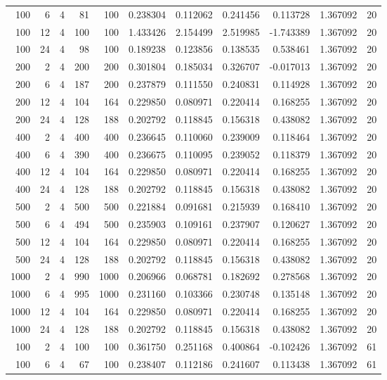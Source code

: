 \begin{table}
\begin{tabular}{rrrrrrrrrrr}
100 & 6 & 4 & 81 & 100 & 0.238304 & 0.112062 & 0.241456 & 0.113728 & 1.367092 & 20 \\
100 & 12 & 4 & 100 & 100 & 1.433426 & 2.154499 & 2.519985 & -1.743389 & 1.367092 & 20 \\
100 & 24 & 4 & 98 & 100 & 0.189238 & 0.123856 & 0.138535 & 0.538461 & 1.367092 & 20 \\
200 & 2 & 4 & 200 & 200 & 0.301804 & 0.185034 & 0.326707 & -0.017013 & 1.367092 & 20 \\
200 & 6 & 4 & 187 & 200 & 0.237879 & 0.111550 & 0.240831 & 0.114928 & 1.367092 & 20 \\
200 & 12 & 4 & 104 & 164 & 0.229850 & 0.080971 & 0.220414 & 0.168255 & 1.367092 & 20 \\
200 & 24 & 4 & 128 & 188 & 0.202792 & 0.118845 & 0.156318 & 0.438082 & 1.367092 & 20 \\
400 & 2 & 4 & 400 & 400 & 0.236645 & 0.110060 & 0.239009 & 0.118464 & 1.367092 & 20 \\
400 & 6 & 4 & 390 & 400 & 0.236675 & 0.110095 & 0.239052 & 0.118379 & 1.367092 & 20 \\
400 & 12 & 4 & 104 & 164 & 0.229850 & 0.080971 & 0.220414 & 0.168255 & 1.367092 & 20 \\
400 & 24 & 4 & 128 & 188 & 0.202792 & 0.118845 & 0.156318 & 0.438082 & 1.367092 & 20 \\
500 & 2 & 4 & 500 & 500 & 0.221884 & 0.091681 & 0.215939 & 0.168410 & 1.367092 & 20 \\
500 & 6 & 4 & 494 & 500 & 0.235903 & 0.109161 & 0.237907 & 0.120627 & 1.367092 & 20 \\
500 & 12 & 4 & 104 & 164 & 0.229850 & 0.080971 & 0.220414 & 0.168255 & 1.367092 & 20 \\
500 & 24 & 4 & 128 & 188 & 0.202792 & 0.118845 & 0.156318 & 0.438082 & 1.367092 & 20 \\
1000 & 2 & 4 & 990 & 1000 & 0.206966 & 0.068781 & 0.182692 & 0.278568 & 1.367092 & 20 \\
1000 & 6 & 4 & 995 & 1000 & 0.231160 & 0.103366 & 0.230748 & 0.135148 & 1.367092 & 20 \\
1000 & 12 & 4 & 104 & 164 & 0.229850 & 0.080971 & 0.220414 & 0.168255 & 1.367092 & 20 \\
1000 & 24 & 4 & 128 & 188 & 0.202792 & 0.118845 & 0.156318 & 0.438082 & 1.367092 & 20 \\
100 & 2 & 4 & 100 & 100 & 0.361750 & 0.251168 & 0.400864 & -0.102426 & 1.367092 & 61 \\
100 & 6 & 4 & 67 & 100 & 0.238407 & 0.112186 & 0.241607 & 0.113438 & 1.367092 & 61 \\

\end{tabular}
\end{table}
